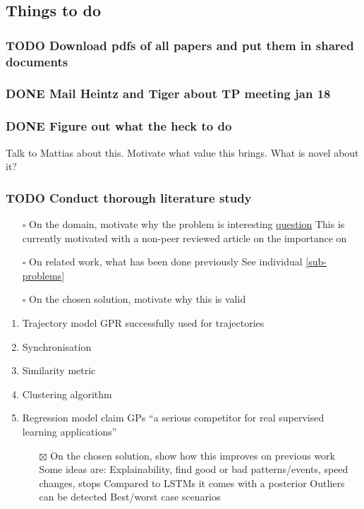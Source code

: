 \documentclass[11pt]{article}
\begin{document}
\subsection{Things to do}
\label{sec:org3f5ea9e}
\subsubsection{{\bfseries\sffamily TODO} Download pdfs of all papers and put them in shared documents}
\label{sec:orgd0757b2}
\subsubsection{{\bfseries\sffamily DONE} Mail Heintz and Tiger about TP meeting jan 18}
\label{sec:orga93cec8}

\subsubsection{{\bfseries\sffamily DONE} Figure out what the heck to do}
\label{sec:orgfccb347}
Talk to Mattias about this. Motivate what value this brings. What
is novel about it?

\subsubsection{{\bfseries\sffamily TODO} Conduct thorough literature study}
\label{sec:org53bdf36}
\begin{itemize}
\item[{$\square$}] On the domain, motivate why the problem is interesting \hyperref[tiger-question-1]{question}
This is currently motivated with a non-peer reviewed article on the importance on

\item[{$\square$}] On related work, what has been done previously
See individual \ref{sub-problems}

\item[{$\square$}] On the chosen solution, motivate why this is valid
\end{itemize}
\begin{enumerate}
\item Trajectory model
\label{sec:orge69d015}
GPR successfully used for trajectories \cite{Kim2011Nov}

\item Synchronisation
\label{sec:orgb234e6f}
\item Similarity metric
\label{sec:org82c3906}
\item Clustering algorithm
\label{sec:orgea0a93f}
\item Regression model
\label{sec:orgcab3a8c}
\cite{Rasmussen-Williams-2006} claim GPs ``a serious competitor for real supervised learning applications''

\begin{itemize}
\item[{$\boxtimes$}] On the chosen solution, show how this improves on previous work
Some ideas are: Explainability, find good or bad
patterns/events, speed changes, stops
Compared to LSTMs it comes with a posterior
Outliers can be detected
Best/worst case scenarios
\end{itemize}
\end{enumerate}
\end{document}
